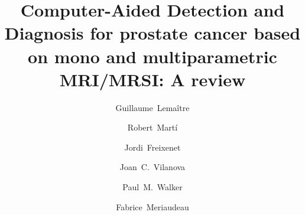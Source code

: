 \begin{frontmatter}



\title{Computer-Aided Detection and Diagnosis for prostate cancer based on mono and multiparametric MRI/MRSI: A review}


\author[label1,label3]{Guillaume~Lema\^itre}
\author[label3]{Robert~Mart\'i}
\author[label3]{Jordi~Freixenet}
\author[label4]{Joan~C.~Vilanova}
\author[label2]{Paul~M.~Walker}
\author[label1]{Fabrice~Meriaudeau}


\address[label1]{\scriptsize LE2I-UMR CNRS 6306, Universit\'{e} de Bourgogne, 12 rue de la Fonderie, 71200 Le Creusot, France}
\address[label2]{\scriptsize LE2I-UMR CNRS 6306, Universit\'{e} de Bourgogne, Avenue Alain Savary, 21000 Dijon, France}
\address[label3]{\scriptsize ViCOROB, Universitat de Girona, Campus Montilivi, Edifici P4, 17071 Girona, Spain}
\address[label4]{\scriptsize Girona Magnetic Resonance Center, 26 Carrer Joan Maragall, 17002 Girona, Spain}



\end{frontmatter}
